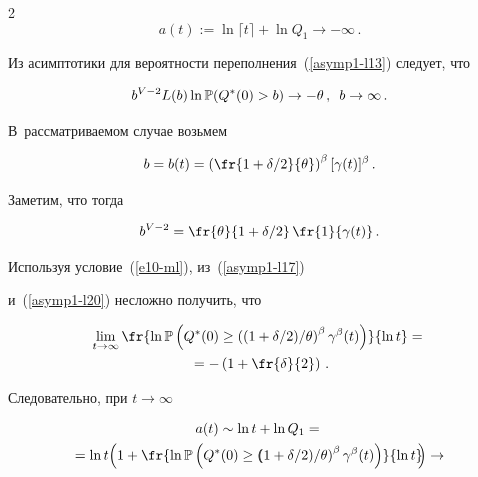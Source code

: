 \begin{multicols}{2}
$$


a(t):=\ln \lceil t \rceil + \ln Q_1 \to -\infty\,.


$$


 Из асимптотики для вероятности переполнения~(\ref{asymp1-l13}) следует, что


\begin{equation}


b^{V-2}L(b)\ln \mathbb{P}(Q^*(0)>b)\to   -\theta\,,\enskip b\to \infty\,.


\label{asymp1-l17}


\end{equation}


В~рассматриваемом случае возьмем


$$


b=b(t)=\left( \fr{1+{\delta}/{2}}{\theta} \right)^\beta[\gamma(t)]^\beta\,.


$$


Заметим, что тогда


\begin{equation}


b^{V-2}=\fr{\theta}{1+{\delta}/{2}}\, \fr{1}{\gamma(t)}\,. 


\label{asymp1-l20}


\end{equation}


Используя условие~(\ref{e10-ml}), из~(\ref{asymp1-l17})


и~(\ref{asymp1-l20}) несложно получить, что


\begin{multline*}


\lim\limits_{t \to \infty} \fr{\ln \mathbb{P} \left( Q^*(0) \geq \left(


(1+\delta/2)/{\theta}\right)^\beta \gamma^\beta(t)


\right)}{\ln t}={}\\


{}=-\left(1+\fr{\delta}{2}\right)\,.


\end{multline*}


Следовательно, при $t \to \infty$


\begin{multline*}


a(t) \sim \ln t + \ln Q_1={}\\


{}= \ln t\! \left( 1+\fr{\ln \mathbb{P} \left( Q^*(0) \geq \left(\!\!


(1+\delta/2)/{\theta}\right)^\beta \gamma^\beta(t) \right)}{\ln t}\!\!\right)\to{}\\



\end{multline*}
\end{multicols}
